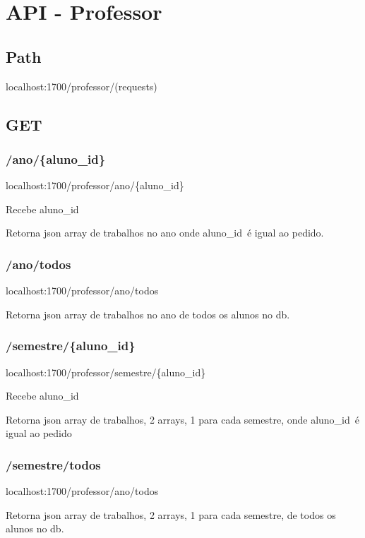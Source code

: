 \documentclass[../main.tex]{subfiles}
\begin{document}
\section{API - Professor}

\subsection{Path}
localhost:1700/professor/(requests)

\subsection{GET}
\subsubsection{/ano/\{aluno\_id\}}
localhost:1700/professor/ano/\{aluno\_id\} \par

Recebe aluno\_id\ \par
Retorna json array de trabalhos no ano onde aluno\_id\ é igual ao pedido. \newline

\subsubsection{/ano/todos}
localhost:1700/professor/ano/todos \par

Retorna json array de trabalhos no ano de todos os alunos no db. \newline

\subsubsection{/semestre/\{aluno\_id\}}
localhost:1700/professor/semestre/\{aluno\_id\} \par

Recebe aluno\_id\ \par
Retorna json array de trabalhos, 2 arrays, 1 para cada semestre, onde aluno\_id\ é igual ao pedido \newline

\subsubsection{/semestre/todos}
localhost:1700/professor/ano/todos \par

Retorna json array de trabalhos, 2 arrays, 1 para cada semestre, de todos os alunos no db. \newline
\end{document}

